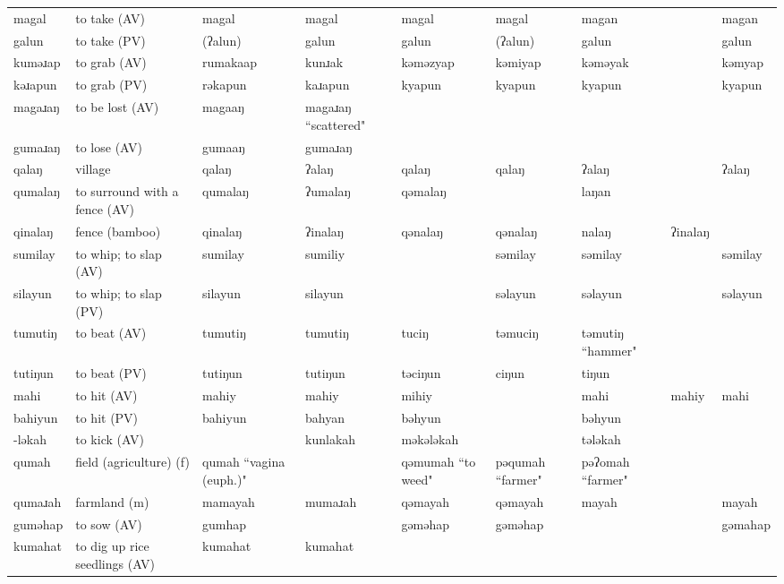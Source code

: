 \begin{landscape}
\begin{longtable}{*{9}{>{\raggedright\arraybackslash}p{}}}
\text{*}magal & to take (AV) & magal & magal & magal & magal & magan &  & magan\\
\text{*}galun & to take (PV) & (ʔalun) & galun & galun & (ʔalun) & galun &  & galun\\
\text{*}kuməɹap & to grab (AV) & rumakaap & kunɹak & kəməzyap & kəmiyap & kəməyak &  & kəmyap\\
\text{*}kəɹapun & to grab (PV) & rəkapun & kaɹapun & kyapun & kyapun & kyapun &  & kyapun\\
\text{*}magaɹaŋ & to be lost (AV) & magaaŋ & magaɹaŋ ``scattered" &  &  &  &  & \\
\text{*}gumaɹaŋ & to lose (AV) & gumaaŋ & gumaɹaŋ &  &  &  &  & \\
\text{*}qalaŋ & village & qalaŋ & ʔalaŋ & qalaŋ & qalaŋ & ʔalaŋ &  & ʔalaŋ\\
\text{*}qumalaŋ & to surround with a fence (AV) & qumalaŋ & ʔumalaŋ & qəmalaŋ &  & laŋan &  & \\
\text{*}qinalaŋ & fence (bamboo) & qinalaŋ & ʔinalaŋ & qənalaŋ & qənalaŋ & nalaŋ & ʔinalaŋ & \\
\text{*}sumilay & to whip; to slap (AV) & sumilay & sumiliy &  & səmilay & səmilay &  & səmilay\\
\text{*}silayun & to whip; to slap (PV) & silayun & silayun &  & səlayun & səlayun &  & səlayun\\
\text{*}tumutiŋ & to beat (AV) & tumutiŋ & tumutiŋ & tuciŋ & təmuciŋ & təmutiŋ \newline ``hammer" &  & \\
\text{*}tutiŋun & to beat (PV) & tutiŋun & tutiŋun & təciŋun & ciŋun & tiŋun &  & \\
\text{*}mahi & to hit (AV) & mahiy & mahiy & mihiy &  & mahi & mahiy & mahi\\
\text{*}bahiyun & to hit (PV) & bahiyun & bahyan & bəhyun &  & bəhyun &  & \\
\text{*}-ləkah & to kick (AV) &  & kunlakah & məkələkah &  & tələkah &  & \\
\text{*}qumah & field (agriculture) (f) & qumah ``vagina (euph.)" &  & qəmumah \newline ``to weed" & pəqumah ``farmer" & pəʔomah ``farmer" &  & \\
\text{*}qumaɹah & farmland (m) & mamayah & mumaɹah & qəmayah & qəmayah & mayah &  & mayah\\
\text{*}guməhap & to sow (AV) & gumhap &  & gəməhap & gəməhap &  &  & gəmahap\\
\text{*}kumahat & to dig up rice seedlings (AV) & kumahat & kumahat &  &  &  &  & \\

\end{longtable}
\end{landscape}
